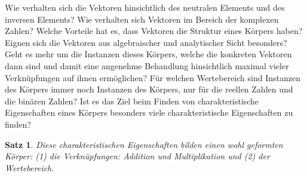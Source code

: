 \documentclass[oneside]{scrbook}
\newtheorem{satz}{Satz}[section]
\numberwithin{equation}{section}
\begin{document}
Wie verhalten sich die Vektoren hinsichtlich des neutralen Elements und des inversen Elements? Wie verhalten sich Vektoren im Bereich der komplexen Zahlen? Welche Vorteile hat es, dass Vektoren die Struktur eines Körpers haben? Eignen sich die Vektoren aus algebraischer und analytischer Sicht besonders? Geht es mehr um die Instanzen dieses Körpers, welche die konkreten Vektoren dann sind und damit eine angenehme Behandlung hinsichtlich maximal vieler Verknüpfungen auf ihnen ermöglichen? Für welchen Wertebereich sind Instanzen des Körpers immer noch Instanzen des Körpers, nur für die reellen Zahlen und die binären Zahlen? Ist es das Ziel beim Finden von charakteristische Eigenschaften eines Körpers besonders viele charakteristische Eigenschaften zu finden? 
\begin{satz}
	Diese charakteristischen Eigenschaften bilden einen wohl geformten Körper: (1) die Verknüpfungen: Addition und Multiplikation und (2) der Wertebereich.
\end{satz}
\end{document}
